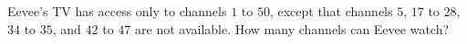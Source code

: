 Eevee's TV has access only to channels $1$ to $50$, except that channels $5$, $17$ to $28$, $34$ to $35$, and $42$ to $47$ are not available. How many channels can Eevee watch?
